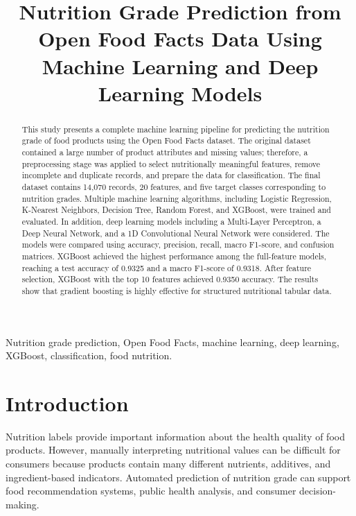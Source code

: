 \documentclass[conference]{IEEEtran}
\begin{document}
\title{Nutrition Grade Prediction from Open Food Facts Data Using Machine Learning and Deep Learning Models}

\author{
}

\maketitle

\begin{abstract}
This study presents a complete machine learning pipeline for predicting the nutrition grade of food products using the Open Food Facts dataset. The original dataset contained a large number of product attributes and missing values; therefore, a preprocessing stage was applied to select nutritionally meaningful features, remove incomplete and duplicate records, and prepare the data for classification. The final dataset contains 14,070 records, 20 features, and five target classes corresponding to nutrition grades. Multiple machine learning algorithms, including Logistic Regression, K-Nearest Neighbors, Decision Tree, Random Forest, and XGBoost, were trained and evaluated. In addition, deep learning models including a Multi-Layer Perceptron, a Deep Neural Network, and a 1D Convolutional Neural Network were considered. The models were compared using accuracy, precision, recall, macro F1-score, and confusion matrices. XGBoost achieved the highest performance among the full-feature models, reaching a test accuracy of 0.9325 and a macro F1-score of 0.9318. After feature selection, XGBoost with the top 10 features achieved 0.9350 accuracy. The results show that gradient boosting is highly effective for structured nutritional tabular data.
\end{abstract}

\begin{IEEEkeywords}
Nutrition grade prediction, Open Food Facts, machine learning, deep learning, XGBoost, classification, food nutrition.
\end{IEEEkeywords}

\section{Introduction}
Nutrition labels provide important information about the health quality of food products. However, manually interpreting nutritional values can be difficult for consumers because products contain many different nutrients, additives, and ingredient-based indicators. Automated prediction of nutrition grade can support food recommendation systems, public health analysis, and consumer decision-making.
\end{document}
